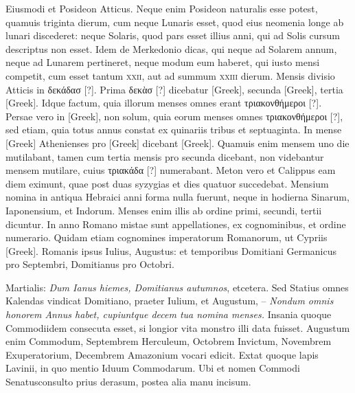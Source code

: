 Eiusmodi et Posideon Atticus.
Neque enim Posideon
naturalis esse potest, quamuis triginta dierum, cum neque Lunaris
esset, quod eius neomenia longe ab lunari discederet: neque Solaris,
quod pars esset illius anni, qui ad Solis cursum descriptus non esset.
Idem de Merkedonio dicas, qui neque ad Solarem annum, neque ad
Lunarem pertineret, neque modum eum haberet, qui iusto mensi
competit, cum esset tantum \textsc{xxii}, aut ad summum \textsc{xxiii} dierum.
Mensis divisio Atticis in \textgreek{δεκάδασ [?]}.
Prima \textgreek{δεκὰσ [?]} dicebatur \textgreek{[Greek]},
secunda \textgreek{[Greek]}, tertia \textgreek{[Greek]}.
Idque factum, quia
illorum menses omnes erant \textgreek{τριακονθήμεροι [?]}.
Persae vero in \textgreek{[Greek]},
non solum, quia eorum menses omnes \textgreek{τριακονθήμεροι [?]},
 sed etiam, quia
totus annus constat ex quinariis tribus et septuaginta.
In mense \textgreek{[Greek]}
Athenienses pro \textgreek{[Greek]} dicebant \textgreek{[Greek]}.
Quamuis
enim mensem uno die mutilabant, tamen cum tertia mensis
pro secunda dicebant, non videbantur mensem mutilare, cuius
\textgreek{τριακάδα [?]} numerabant.
Meton vero et Calippus eam diem eximunt,
quae post duas syzygias et dies quatuor succedebat.
Mensium nomina
in antiqua Hebraici anni forma nulla fuerunt, neque in hodierna
Sinarum, Iaponensium, et Indorum.
Menses enim illis ab ordine
primi, secundi, tertii dicuntur.
In anno Romano mistae sunt appellationes,
ex cognominibus, et ordine numerario.
Quidam etiam cognomines
imperatorum Romanorum, ut Cypriis \textgreek{[Greek]}.
Romanis ipsus Iulius, Augustus: et temporibus Domitiani
Germanicus pro Septembri, Domitianus pro Octobri.

Martialis:
 \textit{Dum Ianus hiemes, Domitianus
autumnos}, etcetera.
Sed Statius omnes
Kalendas vindicat Domitiano,
praeter Iulium, et Augustum,
– \textit{Nondum omnis honorem
Annus habet, cupiuntque decem tua
nomina menses.}
Insania quoque
Commodiidem consecuta esset, si
longior vita monstro illi data fuisset.
Augustum enim Commodum,
Septembrem Herculeum, Octobrem
Invictum, Novembrem
Exuperatorium, Decembrem
Amazonium vocari edicit.
Extat
quoque lapis Lavinii, in quo mentio
Iduum Commodarum.
Ubi et
nomen Commodi Senatusconsulto prius derasum, postea alia manu
incisum.

